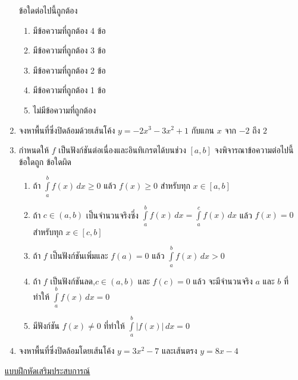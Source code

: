 \documentclass[hidelinks,12pt,a4paper]{article}
\makeatletter
\newcommand{\s}{\space}
\newcommand{\Jitem}{%
  \refstepcounter{\@enumctr}%
  \item[%
    {\raisebox{-0ex}[0pt][0pt]{$\boldsymbol{\textcolor{magenta}{\mathbf{J}}^{\color{blue}{p}}}$}}%
    \,%
    \@nameuse{label\@enumctr}]%
}
\makeatother
\begin{document}
\begin{enumerate}
    ข้อใดต่อไปนี้ถูกต้อง
    \begin{enumerate}
        \renewcommand{\labelenumii}{\arabic{enumii})}
        \item มีข้อความที่ถูกต้อง 4 ข้อ
        \item มีข้อความที่ถูกต้อง 3 ข้อ
        \item มีข้อความที่ถูกต้อง 2 ข้อ
        \item มีข้อความที่ถูกต้อง 1 ข้อ
        \item ไม่มีข้อความที่ถูกต้อง
    \end{enumerate}
    \vspace{10mm}
    \item จงหาพื้นที่ซึ่งปิดล้อมด้วยเส้นโค้ง $y=-2x^3-3x^2+1$ กับแกน $x$ จาก $-2$ ถึง $2$
    \newpage
    \item กำหนดให้ $f$ เป็นฟังก์ชันต่อเนื่องและอินทิเกรตได้บนช่วง $[a,b]$ จงพิจารณาข้อความต่อไปนี้ ข้อใดถูก ข้อใดผิด
    \begin{enumerate}
        \renewcommand{\labelenumii}{$\_\_\_\_$ \s\arabic{enumii})}
        \item ถ้า \s $\displaystyle\int\limits_a^b f(x)\,dx \geq 0$ \s แล้ว \s $f(x)\geq0$ สำหรับทุก $x\in[a,b]$
        \item ถ้า \s $c\in(a,b)$ เป็นจำนวนจริงซึ่ง $\displaystyle\int\limits_a^b f(x)\,dx = \displaystyle\int\limits_a^c f(x)\,dx$ \s แล้ว \s $f(x)=0$ สำหรับทุก $x\in[c,b]$
        \item ถ้า $f$ เป็นฟังก์ชันเพิ่มและ $f(a)=0$ แล้ว \s $\displaystyle\int\limits_a^b f(x)\,dx > 0$
        \item ถ้า $f$ เป็นฟังก์ชันลด,\s $c\in(a,b)$ และ $f(c)=0$ แล้ว \s จะมีจำนวนจริง $a$ และ $b$ ที่ทำให้ $\displaystyle\int\limits_a^b f(x)\,dx=0$ 
        \item มีฟังก์ชัน $f(x)\neq0$ ที่ทำให้ $\displaystyle\int\limits_a^b |f(x)|\,dx=0$
    \end{enumerate}
    \vspace{20mm}
    \Jitem จงหาพื้นที่ซึ่งปิดล้อมโดยเส้นโค้ง $y=3x^2-7$ และเส้นตรง $y=8x-4$
\end{enumerate}
\newpage
\underline{\large แบบฝึกหัดเสริมประสบการณ์}
\end{document}
